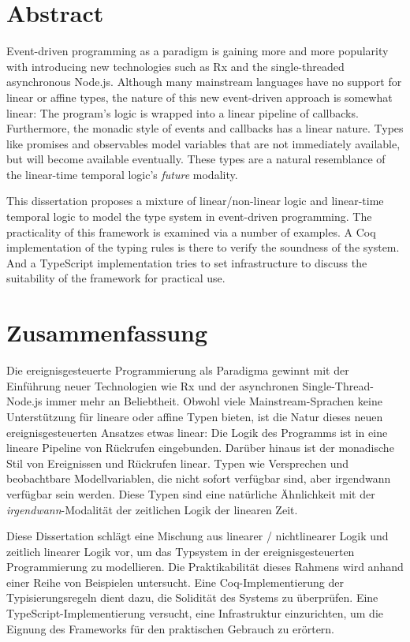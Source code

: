 \chapter*{Abstract}
Event-driven programming as a paradigm is gaining more and more popularity with introducing new technologies such as Rx and the single-threaded asynchronous Node.js. Although many mainstream languages have no support for linear or affine types, the nature of this new event-driven approach is somewhat linear: The program's logic is wrapped into a linear pipeline of callbacks. Furthermore, the monadic style of events and callbacks has a linear nature. Types like promises and observables model variables that are not immediately available, but will become available eventually. These types are a natural resemblance of the linear-time temporal logic's \textit{future} modality.

This dissertation proposes a mixture of linear/non-linear logic and linear-time temporal logic to model the type system in event-driven programming. The practicality of this framework is examined via a number of examples. A Coq implementation of the typing rules is there to verify the soundness of the system. And a TypeScript implementation tries to set infrastructure to discuss the suitability of the framework for practical use.

\chapter*{Zusammenfassung}
Die ereignisgesteuerte Programmierung als Paradigma gewinnt mit der Einführung neuer Technologien wie Rx und der asynchronen Single-Thread-Node.js immer mehr an Beliebtheit. Obwohl viele Mainstream-Sprachen keine Unterstützung für lineare oder affine Typen bieten, ist die Natur dieses neuen ereignisgesteuerten Ansatzes etwas linear: Die Logik des Programms ist in eine lineare Pipeline von Rückrufen eingebunden. Darüber hinaus ist der monadische Stil von Ereignissen und Rückrufen linear. Typen wie Versprechen und beobachtbare Modellvariablen, die nicht sofort verfügbar sind, aber irgendwann verfügbar sein werden. Diese Typen sind eine natürliche Ähnlichkeit mit der \textit{irgendwann}-Modalität der zeitlichen Logik der linearen Zeit.

Diese Dissertation schlägt eine Mischung aus linearer / nichtlinearer Logik und zeitlich linearer Logik vor, um das Typsystem in der ereignisgesteuerten Programmierung zu modellieren. Die Praktikabilität dieses Rahmens wird anhand einer Reihe von Beispielen untersucht. Eine Coq-Implementierung der Typisierungsregeln dient dazu, die Solidität des Systems zu überprüfen. Eine TypeScript-Implementierung versucht, eine Infrastruktur einzurichten, um die Eignung des Frameworks für den praktischen Gebrauch zu erörtern.
